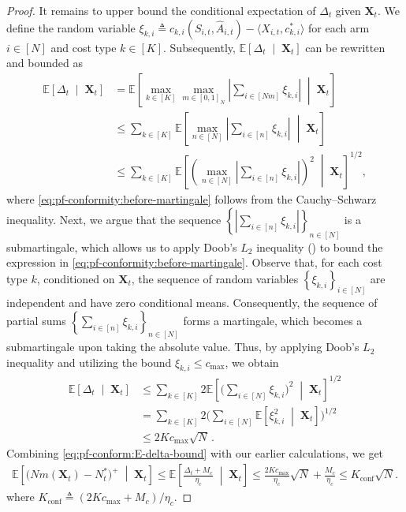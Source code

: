 \documentclass{article}
\theoremstyle{plain}
\theoremstyle{remark}
\newcommand{\E}[1]{\mathbb{E}\left[#1\right]}
\newcommand{\givenmiddle}{\;\middle|\;}
\newcommand{\abs}[1]{\left\lvert#1\right\rvert}
\newcommand{\sumk}{\sum_{k\in[K]}}
\newcommand{\maxk}{\max_{k\in[K]}}
\newcommand{\conf}{\text{conf}}
\def\mX{{\bm{X}}}
\newcommand{\EE}{\mathbb{E}}
\newcommand{\bracket}[1]{\left(#1\right)}
\newcommand{\mbracket}[1]{\left[#1\right]}
\newcommand{\sets}[1]{\left\{ #1 \right\}}
\begin{document}
\begin{proof}
It remains to upper bound the conditional expectation of $\Delta_t$ given $\mX_t$. 
We define the random variable $\xi_{k,i} \triangleq c_{k,i}(S_{i,t},\widehat{A}_{i,t})- \langle X_{i,t}, c_{k,i}^*\rangle$ for each arm $i\in[N]$ and cost type $k\in[K]$. 
Subsequently, $\EE\mbracket{\Delta_t\givenmiddle\mX_t}$ can be rewritten and bounded as 
\begin{align}
    \nonumber
     \EE\mbracket{\Delta_t\givenmiddle\mX_t} 
     &= \E{\maxk \max_{m\in[0,1]_N} \abs{\sum_{i\in[Nm]}\xi_{k,i}} \givenmiddle \mX_t} \\
     \nonumber
     &\leq  \sumk \EE\mbracket{\max_{n\in[N]}\abs{\sum_{i\in[n]}\xi_{k,i}} \givenmiddle \mX_t} \\
    \label{eq:pf-conformity:before-martingale}
     &\leq  \sumk \EE\mbracket{\bracket{\max_{n\in[N]} \abs{\sum_{i\in[n]}\xi_{k,i}}}^2 \givenmiddle \mX_t}^{1/2},
\end{align}
where \eqref{eq:pf-conformity:before-martingale} follows from the Cauchy–Schwarz inequality. 
Next, we argue that the sequence $\sets{\abs{\sum_{i\in[n]}\xi_{k,i}}}_{n\in[N]}$ is a submartingale, which allows us to apply Doob's $L_2$ inequality (\citealp[Theorem 5.4.3]{Dur_19_prob_book}) to bound the expression in \eqref{eq:pf-conformity:before-martingale}. Observe that, for each cost type $k$, conditioned on $\mX_t$, the sequence of random variables $\sets{\xi_{k,i}}_{i\in[N]}$ are independent and have zero conditional means. 
Consequently, the sequence of partial sums $\left\{\sum_{i\in[n]}\xi_{k,i}\right\}_{n\in[N]}$ forms a martingale, which becomes a submartingale upon taking the absolute value. 
Thus, by applying Doob's $L_2$ inequality and utilizing the bound $\xi_{k,i}\leq c_{\max}$, we obtain 
\begin{align}    
    \nonumber
    \EE\mbracket{\Delta_t\givenmiddle\mX_t} 
    &\leq \sumk 2\EE\mbracket{ \bigg(\sum_{i\in[N]}\xi_{k,i}\bigg)^2 \givenmiddle \mX_t}^{1/2} \\
    \nonumber
    &=  \sumk 2\bigg(\sum_{i\in[N]} \EE\mbracket{\xi_{k,i}^2 \givenmiddle \mX_t}\bigg)^{1/2}\\ 
    \label{eq:pf-conform:E-delta-bound}
    &\leq 2Kc_{\max}\sqrt{N}\,.
\end{align}
Combining \eqref{eq:pf-conform:E-delta-bound} with our earlier calculations, we get 
\begin{align*}
    \E{\big(Nm(\mX_t) - N_t^*\big)^+ \givenmiddle \mX_t} 
    \leq \EE\mbracket{\frac{\Delta_t+M_c}{\eta_c} \givenmiddle \mX_t} 
    \leq \frac{2Kc_{\max}}{\eta_c}\sqrt{N}+\frac{M_c}{\eta_c} \leq K_{\conf}\sqrt{N}. 
\end{align*}
where $K_{\conf} \triangleq (2Kc_{\max} + M_c) / \eta_c$. 
\end{proof}
\end{document}
